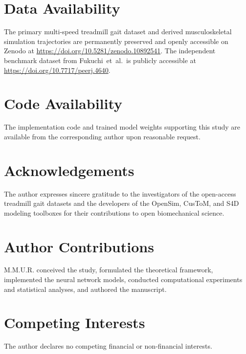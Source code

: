 \documentclass[fleqn,10pt]{wlscirep}
\begin{document}
\section{Data Availability}

The primary multi-speed treadmill gait dataset and derived musculoskeletal simulation trajectories are permanently preserved and openly accessible on Zenodo at \url{https://doi.org/10.5281/zenodo.10892541}\cite{legoff2026sixspeed}. The independent benchmark dataset from Fukuchi~et~al.\ is publicly accessible at \url{https://doi.org/10.7717/peerj.4640}\cite{fukuchi2018public}.

\section{Code Availability}

The implementation code and trained model weights supporting this study are available from the corresponding author upon reasonable request.

\section{Acknowledgements}

The author expresses sincere gratitude to the investigators of the open-access treadmill gait datasets and the developers of the OpenSim, CusToM, and S4D modeling toolboxes for their contributions to open biomechanical science.

\section{Author Contributions}

M.M.U.R. conceived the study, formulated the theoretical framework, implemented the neural network models, conducted computational experiments and statistical analyses, and authored the manuscript.

\section*{Competing Interests}

The author declares no competing financial or non-financial interests.


\end{document}
